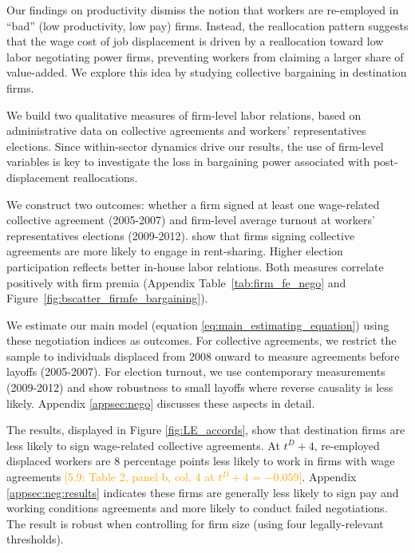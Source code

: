 

Our findings on productivity dismiss the notion that workers are re-employed in ``bad'' (low productivity, low pay) firms. Instead, the reallocation pattern suggests that the wage cost of job displacement is driven by a reallocation toward low labor negotiating power firms, preventing workers from claiming a larger share of value-added. We explore this idea by studying collective bargaining in destination firms. 


We build two qualitative measures of firm-level labor relations, based on administrative data on collective agreements and workers' representatives elections. Since within-sector dynamics drive our results, the use of firm-level variables is key to investigate the loss in bargaining power associated with post-displacement reallocations.

We construct two outcomes: whether a firm signed at least one wage-related collective agreement (2005-2007) and firm-level average turnout at workers' representatives elections (2009-2012). \citet{carluccio2015trade} show that firms signing collective agreements are more likely to engage in rent-sharing. Higher election participation reflects better in-house labor relations. Both measures correlate positively with firm premia (Appendix Table~\ref{tab:firm_fe_nego} and Figure~\ref{fig:bscatter_firmfe_bargaining}).

We estimate our main model (equation \ref{eq:main_estimating_equation}) using these negotiation indices as outcomes. For collective agreements, we restrict the sample to individuals displaced from 2008 onward to measure agreements before layoffs (2005-2007). For election turnout, we use contemporary measurements (2009-2012) and show robustness to small layoffs where reverse causality is less likely. Appendix \ref{appsec:nego} discusses these aspects in detail.

The results, displayed in Figure \ref{fig:LE_accords}, show that destination firms are less likely to sign wage-related collective agreements. At $t^D+4$, re-employed displaced workers are 8 percentage points less likely to work in firms with wage agreements \textcolor{orange}{[5.9: Table 2, panel b, col. 4 at $t^D+4$ = $-0.059$]}. Appendix \ref{appsec:neg:results} indicates these firms are generally less likely to sign pay and working conditions agreements and more likely to conduct failed negotiations. The result is robust when controlling for firm size (using four legally-relevant thresholds).

